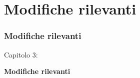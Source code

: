 %

\section{Modifiche rilevanti}
\begin{frame}[fragile]
	\frametitle{Modifiche rilevanti}

	\begin{center}\huge{Capitolo 3:}\end{center}
	\begin{center}\huge{\color{typo3darkgrey}\textbf{Modifiche rilevanti}}\end{center}

\end{frame}


